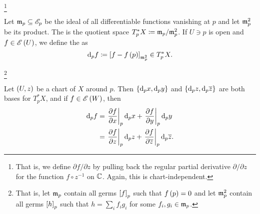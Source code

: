 \documentclass[../Moduli_Spaces_of_Riemann_Surfaces.tex]{subfiles}
\begin{document}
    \footnote{That is, we define $\partial f/\partial z$ by pulling back the regular partial derivative $\partial/\partial z$ for the function $f\circ z^{-1}$ on $\mathbb{C}$. Again, this is chart-independent.}
    \begin{definition}
        Let $\mathfrak{m}_p\subseteq\mathscr{E}_p$ be the ideal of all differentiable functions vanishing at $p$ and let $\mathfrak{m}_p^2$ be its product. The  is the quotient space $T_p^\ast X\coloneqq\mathfrak{m}_p/\mathfrak{m}^2_p$. If $U\ni p$ is open and $f\in\mathscr{E}\left(U\right)$, we define the  as
        \begin{equation*}
            \mathrm{d}_pf\coloneqq\left[f-f\left(p\right)\right]_{\mathfrak{m}_p^2}\in T_p^\ast X.
        \end{equation*}
    \end{definition}
    \footnote{That is, let $\mathfrak{m}_p$ contain all germs $\left[f\right]_p$ such that $f\left(p\right)=0$ and let $\mathfrak{m}^2_p$ contain all germs $\left[h\right]_p$ such that $h=\sum_if_ig_i$ for some $f_i,g_i\in\mathfrak{m}_p$.}
    \begin{proposition}
        Let $\left(U,z\right)$ be a chart of $X$ around $p$. Then $\left\{\mathrm{d}_px,\mathrm{d}_py\right\}$ and $\left\{\mathrm{d}_pz,\mathrm{d}_p\overline{z}\right\}$ are both bases for $T_p^\ast X$, and if $f\in\mathscr{E}\left(W\right)$, then
        \begin{equation*}
            \begin{aligned}
                \mathrm{d}_pf&=\left.\frac{\partial f}{\partial x}\right|_p\mathrm{d}_px+\left.\frac{\partial f}{\partial y}\right|_p\mathrm{d}_py \\
                     &=\left.\frac{\partial f}{\partial z}\right|_p\mathrm{d}_pz+\left.\frac{\partial f}{\partial\overline{z}}\right|_p\mathrm{d}_p\overline{z}.
            \end{aligned}
        \end{equation*}
    \end{proposition}
\end{document}
